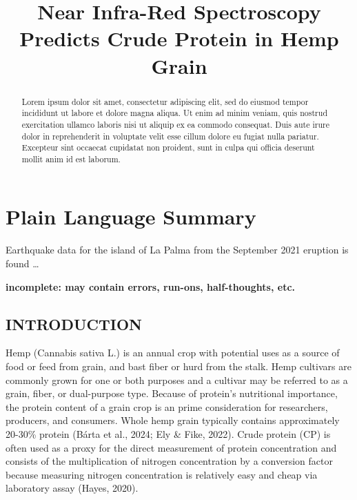 \documentclass[
]{agujournal2019}
\begin{document}
\title{Near Infra-Red Spectroscopy Predicts Crude Protein in Hemp Grain}



\begin{abstract}
Lorem ipsum dolor sit amet, consectetur adipiscing elit, sed do eiusmod
tempor incididunt ut labore et dolore magna aliqua. Ut enim ad minim
veniam, quis nostrud exercitation ullamco laboris nisi ut aliquip ex ea
commodo consequat. Duis aute irure dolor in reprehenderit in voluptate
velit esse cillum dolore eu fugiat nulla pariatur. Excepteur sint
occaecat cupidatat non proident, sunt in culpa qui officia deserunt
mollit anim id est laborum.
\end{abstract}

\section*{Plain Language Summary}
Earthquake data for the island of La Palma from the September 2021
eruption is found \ldots{}



\textbf{incomplete: may contain errors, run-ons, half-thoughts, etc.}

\subsection{INTRODUCTION}\label{introduction}

Hemp (Cannabis sativa L.) is an annual crop with potential uses as a
source of food or feed from grain, and bast fiber or hurd from the
stalk. Hemp cultivars are commonly grown for one or both purposes and a
cultivar may be referred to as a grain, fiber, or dual-purpose type.
Because of protein's nutritional importance, the protein content of a
grain crop is an prime consideration for researchers, producers, and
consumers. Whole hemp grain typically contains approximately 20-30\%
protein (Bárta et al., 2024; Ely \& Fike, 2022). Crude protein (CP) is
often used as a proxy for the direct measurement of protein
concentration and consists of the multiplication of nitrogen
concentration by a conversion factor because measuring nitrogen
concentration is relatively easy and cheap via laboratory assay (Hayes,
2020).
\end{document}
